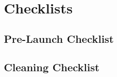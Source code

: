 \newpage
\section{Checklists}

\subsection{Pre-Launch Checklist}\label{sec:appL}

\subsection{Cleaning Checklist}

\newpage

